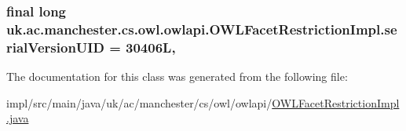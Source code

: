 \hypertarget{classuk_1_1ac_1_1manchester_1_1cs_1_1owl_1_1owlapi_1_1_o_w_l_facet_restriction_impl_a775dcb3d9607feaabe149e777c1998fc}{
\subsubsection[{serial\-Version\-U\-I\-D}]{\setlength{\rightskip}{0pt plus 5cm}final long uk.\-ac.\-manchester.\-cs.\-owl.\-owlapi.\-O\-W\-L\-Facet\-Restriction\-Impl.\-serial\-Version\-U\-I\-D = 30406\-L\hspace{0.3cm}{\ttfamily [static]}, {\ttfamily [private]}}}\label{classuk_1_1ac_1_1manchester_1_1cs_1_1owl_1_1owlapi_1_1_o_w_l_facet_restriction_impl_a775dcb3d9607feaabe149e777c1998fc}


The documentation for this class was generated from the following file\-:\begin{DoxyCompactItemize}
\item 
impl/src/main/java/uk/ac/manchester/cs/owl/owlapi/\hyperlink{_o_w_l_facet_restriction_impl_8java}{O\-W\-L\-Facet\-Restriction\-Impl.\-java}\end{DoxyCompactItemize}
